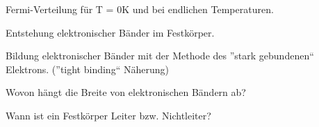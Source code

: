 \documentclass[a5paper,12pt,ngerman,print,grid=front]{kartei}
\begin{document}
	\begin{karte}{
		Fermi-Verteilung für T = 0K und bei endlichen Temperaturen.
		}
		
		
		
	\end{karte}


	\begin{karte}{
		Entstehung elektronischer Bänder im Festkörper.
		}
		
		
		
	\end{karte}


	\begin{karte}{
		Bildung elektronischer Bänder mit der Methode des ”stark gebundenen“ Elektrons. 
		(”tight binding“ Näherung)
		}
		
		
		
	\end{karte}


	\begin{karte}{
		Wovon hängt die Breite von elektronischen Bändern ab?
		}
		
		
		
	\end{karte}


	\begin{karte}{
		Wann ist ein Festkörper Leiter bzw. Nichtleiter?
		}
		
		
		
	\end{karte}

\end{document}
